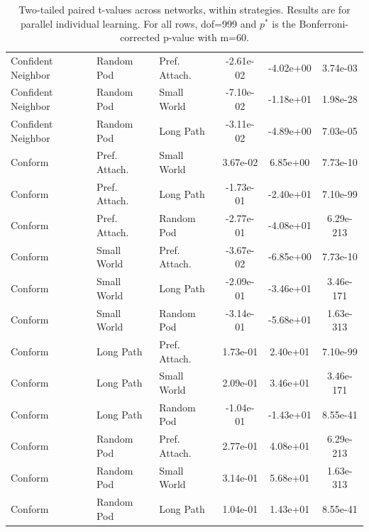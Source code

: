 \begin{table}[]
\begin{tabular}{l|ll|ccc}
Confident Neighbor&Random Pod&Pref. Attach.&-2.61e-02&-4.02e+00&3.74e-03\\
Confident Neighbor&Random Pod&Small World&-7.10e-02&-1.18e+01&1.98e-28\\
Confident Neighbor&Random Pod&Long Path&-3.11e-02&-4.89e+00&7.03e-05\\
\hline
Conform&Pref. Attach.&Small World&3.67e-02&6.85e+00&7.73e-10\\
Conform&Pref. Attach.&Long Path&-1.73e-01&-2.40e+01&7.10e-99\\
Conform&Pref. Attach.&Random Pod&-2.77e-01&-4.08e+01&6.29e-213\\
Conform&Small World&Pref. Attach.&-3.67e-02&-6.85e+00&7.73e-10\\
Conform&Small World&Long Path&-2.09e-01&-3.46e+01&3.46e-171\\
Conform&Small World&Random Pod&-3.14e-01&-5.68e+01&1.63e-313\\
Conform&Long Path&Pref. Attach.&1.73e-01&2.40e+01&7.10e-99\\
Conform&Long Path&Small World&2.09e-01&3.46e+01&3.46e-171\\
Conform&Long Path&Random Pod&-1.04e-01&-1.43e+01&8.55e-41\\
Conform&Random Pod&Pref. Attach.&2.77e-01&4.08e+01&6.29e-213\\
Conform&Random Pod&Small World&3.14e-01&5.68e+01&1.63e-313\\
Conform&Random Pod&Long Path&1.04e-01&1.43e+01&8.55e-41\\
    \hline
    \end{tabular}
    \caption{Two-tailed paired t-values across networks, within strategies. Results are for parallel individual learning. For all rows, dof=999 and $p^*$ is the Bonferroni-corrected p-value with m=60.}
\end{table}

